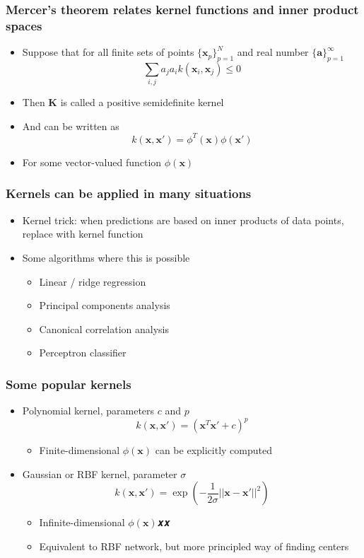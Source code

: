 \documentclass[12pt,notes,mathserif]{beamer}
\begin{document}
\begin{frame}[c]
\frametitle{Mercer's theorem relates kernel functions and inner product spaces}
\begin{itemize}
\item Suppose that for all finite sets of points $\{\mathbf{x}_p\}_{p=1}^N$ and real number $\{\mathbf{a}\}_{p=1}^{\infty}$
\[
\sum_{i,j}a_ja_ik(\mathbf{x}_i,\mathbf{x}_j)\leqslant{}0
\]
\item Then $\mathbf{K}$ is called a positive semidefinite kernel
\item And can be written as
\[
k(\mathbf{x},\mathbf{x}')=\phi^T(\mathbf{x})\phi(\mathbf{x}')
\]
\item For some vector-valued function $\phi(\mathbf{x})$
\end{itemize}
\end{frame}



\begin{frame}[c]
\frametitle{Kernels can be applied in many situations}
\begin{itemize}
\item Kernel trick: when predictions are based on inner products of data points, replace with kernel function
\item Some algorithms where this is possible
\begin{itemize}
\item Linear / ridge regression
\item Principal components analysis
\item Canonical correlation analysis
\item Perceptron classifier
\end{itemize}
\end{itemize}
\end{frame}


\begin{frame}[c]
\frametitle{Some popular kernels}
\begin{itemize}
\item Polynomial kernel, parameters $c$ and $p$
\[
k(\mathbf{x},\mathbf{x}')=(\mathbf{x}^T\mathbf{x}'+c)^p
\]
\begin{itemize}
\item Finite-dimensional $\phi(\mathbf{x})$ can be explicitly computed
\end{itemize}
\item Gaussian or RBF kernel, parameter $\sigma$
\[
k(\mathbf{x},\mathbf{x}')=\exp\left(-\dfrac{1}{2\sigma}||\mathbf{x}-\mathbf{x}'||^2\right)
\]
\begin{itemize}
\item Infinite-dimensional $\phi(\mathbf{x})$𝒙𝒙
\item Equivalent to RBF network, but more principled way of finding centers
\end{itemize}
\end{itemize}
\end{frame}
\end{document}
